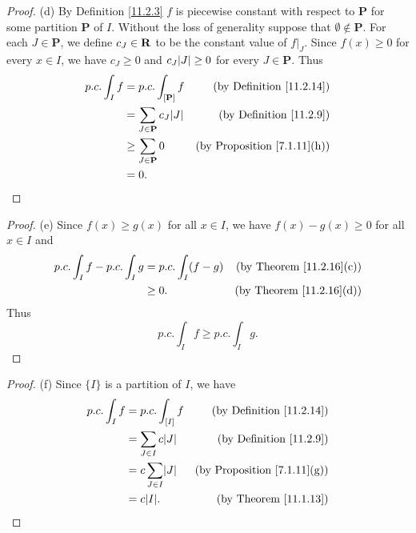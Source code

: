 \begin{proof}{(d)}
    By Definition \ref{11.2.3} \(f\) is piecewise constant with respect to \(\mathbf{P}\) for some partition \(\mathbf{P}\) of \(I\).
    Without the loss of generality suppose that \(\emptyset \notin \mathbf{P}\).
    For each \(J \in \mathbf{P}\), we define \(c_J \in \mathbf{R}\) to be the constant value of \(f|_J\).
    Since \(f(x) \geq 0\) for every \(x \in I\), we have \(c_J \geq 0\) and \(c_J \abs{J} \geq 0\) for every \(J \in \mathbf{P}\).
    Thus
    \begin{align*}
        p.c. \int_I f & = p.c. \int_{[\mathbf{P}]} f          & \text{(by Definition \ref{11.2.14})}    \\
                      & = \sum_{J \in \mathbf{P}} c_J \abs{J} & \text{(by Definition \ref{11.2.9})}     \\
                      & \geq \sum_{J \in \mathbf{P}} 0        & \text{(by Proposition \ref{7.1.11}(h))} \\
                      & = 0.
    \end{align*}
\end{proof}

\begin{proof}{(e)}
    Since \(f(x) \geq g(x)\) for all \(x \in I\), we have \(f(x) - g(x) \geq 0\) for all \(x \in I\) and
    \begin{align*}
        p.c. \int_I f - p.c. \int_I g & = p.c. \int_I (f - g) & \text{(by Theorem \ref{11.2.16}(c))} \\
                                      & \geq 0.               & \text{(by Theorem \ref{11.2.16}(d))}
    \end{align*}
    Thus
    \[
        p.c. \int_I f \geq p.c. \int_I g.
    \]
\end{proof}

\begin{proof}{(f)}
    Since \(\{I\}\) is a partition of \(I\), we have
    \begin{align*}
        p.c. \int_I f & = p.c. \int_{[I]} f        & \text{(by Definition \ref{11.2.14})}    \\
                      & = \sum_{J \in I} c \abs{J} & \text{(by Definition \ref{11.2.9})}     \\
                      & = c \sum_{J \in I} \abs{J} & \text{(by Proposition \ref{7.1.11}(g))} \\
                      & = c \abs{I}.               & \text{(by Theorem \ref{11.1.13})}
    \end{align*}
\end{proof}


